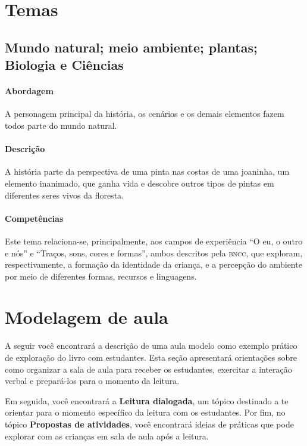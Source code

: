 \documentclass[11pt]{extarticle}
\begin{document}
\section{Temas}


\subsection{Mundo natural; meio ambiente; plantas; Biologia e Ciências}

\paragraph{Abordagem} 
A personagem principal da história, os cenários e os demais elementos fazem
todos parte do mundo natural. 

\paragraph{Descrição} 
A história parte da perspectiva de uma pinta nas costas
de uma joaninha, um elemento inanimado, que ganha vida e
descobre outros tipos de pintas em diferentes seres vivos
da floresta. 

\paragraph{Competências} 
Este tema relaciona-se, principalmente, aos 
campos de experiência ``O eu, o outro e nós'' e ``Traços, sons, cores e formas'',
ambos descritos pela \textsc{bncc}, que exploram, respectivamente, a formação da identidade da criança, 
e a percepção do ambiente por meio de diferentes formas, recursos e linguagens.

\section{Modelagem de aula}
A seguir você encontrará a descrição de uma aula modelo como exemplo 
prático de exploração do livro com estudantes. Esta seção apresentará 
orientações sobre como organizar a sala de aula para receber os 
estudantes, exercitar a interação verbal e prepará-los para o 
momento da leitura.

Em seguida, você encontrará a \textbf{Leitura dialogada}, um 
tópico destinado a te orientar para o momento específico da 
leitura com os estudantes. Por fim, no tópico 
\textbf{Propostas de atividades}, você encontrará ideias 
de práticas que pode explorar com as crianças em sala de 
aula após a leitura. 
\end{document}
